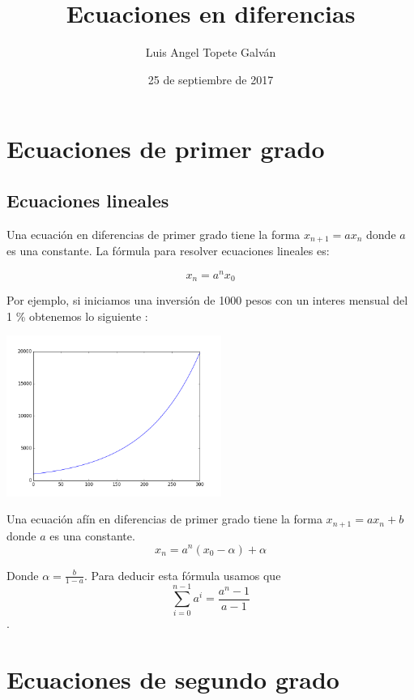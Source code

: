 \documentclass{article}
\title{Ecuaciones en diferencias}
\author{Luis Angel Topete Galván}
\date{25 de septiembre de 2017}
\begin{document}
\maketitle

\section{Ecuaciones de primer grado}

\subsection{Ecuaciones lineales}

Una ecuación en diferencias de primer grado tiene la forma $x_{n+1}=ax_n$ donde $a$ es una constante.
La fórmula para resolver ecuaciones lineales es:

\begin{equation}
  \label{eq:lineal}
  x_n=a^nx_0 
\end{equation}

Por ejemplo, si iniciamos una inversión de 1000 pesos con un interes mensual del 1 \% obtenemos lo siguiente :

\begin{center}
  \includegraphics[width=7cm]{Inversion.png}
\end{center}


Una ecuación afín en diferencias de primer grado tiene la forma $x_{n+1}=ax_n+b$ donde $a$ es una constante.
\begin{equation}
 \label{eq:afin}
 x_n=a^n(x_0-\alpha)+\alpha
\end{equation}

Donde $\alpha=\frac{b}{1-a}$.
Para deducir esta fórmula usamos que $$\sum_{i=0}^{n-1}a^i=\frac{a^n-1}{a-1}$$.
\section{Ecuaciones de segundo grado}
\end{document}

